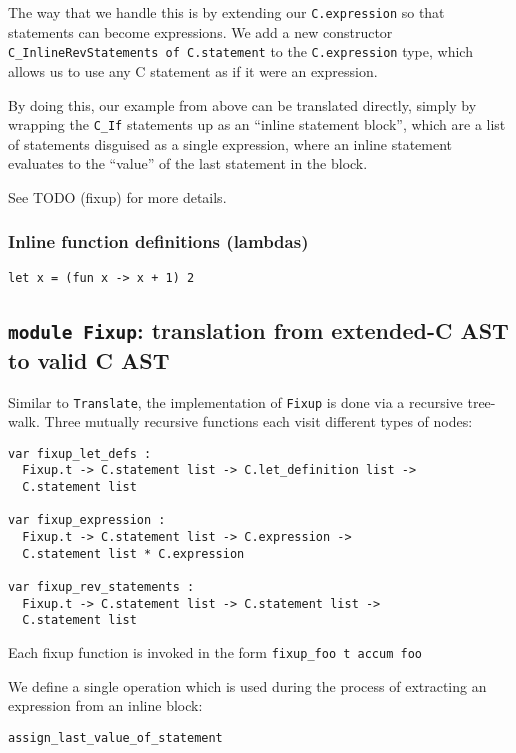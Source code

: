 \documentclass[12pt,a4paper,twoside,openright]{report}
\begin{document}
The way that we handle this is by extending our \lstinline!C.expression! so
that statements can become expressions.  We add a new constructor
\lstinline!C_InlineRevStatements of C.statement! to the
\lstinline!C.expression! type, which allows us to use any C statement as if it
were an expression.

By doing this, our example from above can be translated directly, simply by
wrapping the \lstinline!C_If! statements up as an ``inline statement block'',
which are a list of statements disguised as a single expression, where an
inline statement evaluates to the ``value'' of the last statement in the block.

See TODO (fixup) for more details.


\subsubsection{Inline function definitions (lambdas)}

\begin{lstlisting}
let x = (fun x -> x + 1) 2
\end{lstlisting}

\subsection{\texttt{module Fixup}: translation from extended-C AST to valid C AST}

Similar to \lstinline!Translate!, the implementation of \lstinline!Fixup! is
done via a recursive tree-walk. Three mutually recursive functions each visit
different types of nodes:

\begin{lstlisting}
var fixup_let_defs :
  Fixup.t -> C.statement list -> C.let_definition list ->
  C.statement list

var fixup_expression :
  Fixup.t -> C.statement list -> C.expression ->
  C.statement list * C.expression

var fixup_rev_statements :
  Fixup.t -> C.statement list -> C.statement list ->
  C.statement list
\end{lstlisting}

Each fixup function is invoked in the form \lstinline!fixup_foo t accum foo!

We define a single operation which is used during the process of extracting an
expression from an inline block:

\begin{lstlisting}
assign_last_value_of_statement
\end{lstlisting}
\end{document}
